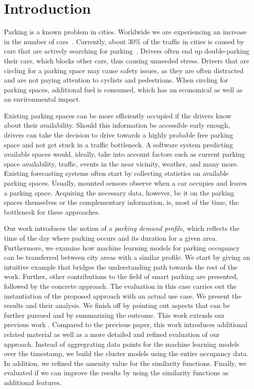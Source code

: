 \section{Introduction}
Parking is a known problem in cities.
Worldwide we are experiencing an increase in the number of cars~\cite{car_increase}.
Currently, about 30\% of the traffic in cities is caused by cars that are actively searching for parking~\cite{traffic_congestion}.
Drivers often end up double-parking their cars, which blocks other cars, thus causing unneeded stress.
Drivers that are circling for a parking space may cause safety issues, as they are often distracted and are not paying attention to cyclists and pedestrians.
When circling for parking spaces, additional fuel is consumed, which has an economical as well as an environmental impact.

Existing parking spaces can be more efficiently occupied if the drivers know about their availability.
Should this information be accessible early enough, drivers can take the decision to drive towards a highly probable free parking space and not get stuck in a traffic bottleneck.
A software system predicting available spaces would, ideally, take into account factors such as current parking space availability, traffic, events in the near vicinity, weather, and many more.
Existing forecasting systems often start by collecting statistics on available parking spaces.
Usually, mounted sensors observe when a car occupies and leaves a parking space.
Acquiring the necessary data, however, be it on the parking spaces themselves or the complementary information, is, most of the time, the bottleneck for these approaches. 

Our work introduces the notion of a \textit{parking demand profile}, which reflects the time of the day where parking occurs and its duration for a given area.
Furthermore, we examine how machine learning models for parking occupancy can be transferred between city areas with a similar profile.
We start by giving an intuitive example that bridges the understanding path towards the rest of the work.
Further, other contributions to the field of smart parking are presented, followed by the concrete approach.
The evaluation in this case carries out the instantiation of the proposed approach with an actual use case. We present the results and their analysis.
We finish off by pointing out aspects that can be further pursued and by summarizing the outcome.
This work extends our previous work \cite{ionita2018park}. Compared to the previous paper, this work introduces additional related material as well as a more detailed and refined evaluation of our approach.
Instead of aggregrating data points for the machine learning models over the timestamp, we build the cluster models using the entire occupancy data. 
In addition, we refined the amenity value for the similarity functions. Finally, we evaluated if we can improve the results by using the similarity functions as additional features. 

